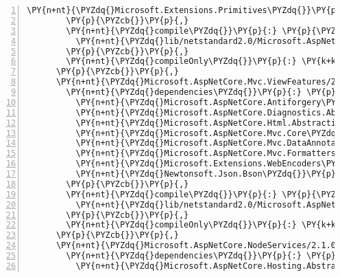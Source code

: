 \begin{Verbatim}[commandchars=\\\{\},numbers=left,firstnumber=1,stepnumber=1,numberblanklines=0]
          \PY{n+nt}{\PYZdq{}Microsoft.Extensions.Primitives\PYZdq{}}\PY{p}{:} \PY{l+s+s2}{\PYZdq{}2.1.0\PYZhy{}rc1\PYZhy{}final\PYZdq{}}
        \PY{p}{\PYZcb{}}\PY{p}{,}
        \PY{n+nt}{\PYZdq{}compile\PYZdq{}}\PY{p}{:} \PY{p}{\PYZob{}}
          \PY{n+nt}{\PYZdq{}lib/netstandard2.0/Microsoft.AspNetCore.Mvc.TagHelpers.dll\PYZdq{}}\PY{p}{:} \PY{p}{\PYZob{}}\PY{p}{\PYZcb{}}
        \PY{p}{\PYZcb{}}\PY{p}{,}
        \PY{n+nt}{\PYZdq{}compileOnly\PYZdq{}}\PY{p}{:} \PY{k+kc}{true}
      \PY{p}{\PYZcb{}}\PY{p}{,}
      \PY{n+nt}{\PYZdq{}Microsoft.AspNetCore.Mvc.ViewFeatures/2.1.0\PYZhy{}rc1\PYZhy{}final\PYZdq{}}\PY{p}{:} \PY{p}{\PYZob{}}
        \PY{n+nt}{\PYZdq{}dependencies\PYZdq{}}\PY{p}{:} \PY{p}{\PYZob{}}
          \PY{n+nt}{\PYZdq{}Microsoft.AspNetCore.Antiforgery\PYZdq{}}\PY{p}{:} \PY{l+s+s2}{\PYZdq{}2.1.0\PYZhy{}rc1\PYZhy{}final\PYZdq{}}\PY{p}{,}
          \PY{n+nt}{\PYZdq{}Microsoft.AspNetCore.Diagnostics.Abstractions\PYZdq{}}\PY{p}{:} \PY{l+s+s2}{\PYZdq{}2.1.0\PYZhy{}rc1\PYZhy{}final\PYZdq{}}\PY{p}{,}
          \PY{n+nt}{\PYZdq{}Microsoft.AspNetCore.Html.Abstractions\PYZdq{}}\PY{p}{:} \PY{l+s+s2}{\PYZdq{}2.1.0\PYZhy{}rc1\PYZhy{}final\PYZdq{}}\PY{p}{,}
          \PY{n+nt}{\PYZdq{}Microsoft.AspNetCore.Mvc.Core\PYZdq{}}\PY{p}{:} \PY{l+s+s2}{\PYZdq{}2.1.0\PYZhy{}rc1\PYZhy{}final\PYZdq{}}\PY{p}{,}
          \PY{n+nt}{\PYZdq{}Microsoft.AspNetCore.Mvc.DataAnnotations\PYZdq{}}\PY{p}{:} \PY{l+s+s2}{\PYZdq{}2.1.0\PYZhy{}rc1\PYZhy{}final\PYZdq{}}\PY{p}{,}
          \PY{n+nt}{\PYZdq{}Microsoft.AspNetCore.Mvc.Formatters.Json\PYZdq{}}\PY{p}{:} \PY{l+s+s2}{\PYZdq{}2.1.0\PYZhy{}rc1\PYZhy{}final\PYZdq{}}\PY{p}{,}
          \PY{n+nt}{\PYZdq{}Microsoft.Extensions.WebEncoders\PYZdq{}}\PY{p}{:} \PY{l+s+s2}{\PYZdq{}2.1.0\PYZhy{}rc1\PYZhy{}final\PYZdq{}}\PY{p}{,}
          \PY{n+nt}{\PYZdq{}Newtonsoft.Json.Bson\PYZdq{}}\PY{p}{:} \PY{l+s+s2}{\PYZdq{}1.0.1\PYZdq{}}
        \PY{p}{\PYZcb{}}\PY{p}{,}
        \PY{n+nt}{\PYZdq{}compile\PYZdq{}}\PY{p}{:} \PY{p}{\PYZob{}}
          \PY{n+nt}{\PYZdq{}lib/netstandard2.0/Microsoft.AspNetCore.Mvc.ViewFeatures.dll\PYZdq{}}\PY{p}{:} \PY{p}{\PYZob{}}\PY{p}{\PYZcb{}}
        \PY{p}{\PYZcb{}}\PY{p}{,}
        \PY{n+nt}{\PYZdq{}compileOnly\PYZdq{}}\PY{p}{:} \PY{k+kc}{true}
      \PY{p}{\PYZcb{}}\PY{p}{,}
      \PY{n+nt}{\PYZdq{}Microsoft.AspNetCore.NodeServices/2.1.0\PYZhy{}rc1\PYZhy{}final\PYZdq{}}\PY{p}{:} \PY{p}{\PYZob{}}
        \PY{n+nt}{\PYZdq{}dependencies\PYZdq{}}\PY{p}{:} \PY{p}{\PYZob{}}
          \PY{n+nt}{\PYZdq{}Microsoft.AspNetCore.Hosting.Abstractions\PYZdq{}}\PY{p}{:} \PY{l+s+s2}{\PYZdq{}2.1.0\PYZhy{}rc1\PYZhy{}final\PYZdq{}}\PY{p}{,}

\end{Verbatim}

